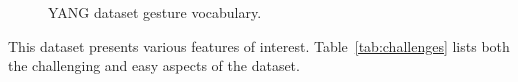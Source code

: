 \begin{figure}[tbh]
\centering
{}
\caption{YANG dataset gesture vocabulary.}
\label{fig:yang}
\end{figure}

This dataset presents various features of interest. Table~\ref{tab:challenges} lists
both the challenging and easy aspects of the dataset.


